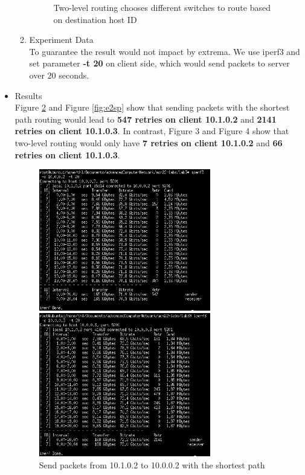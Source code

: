 \documentclass[a4paper,11pt]{article}
\begin{document}
\begin{itemize}
\begin{enumerate}
\begin{figure}[htbp]
        \caption{Two-level routing chooses different switches to route based on destination host ID}
        \label{fig:ft}
        \end{figure}
        \item Experiment Data \\
        To guarantee the result would not impact by extrema.  We use iperf3 and set parameter\textbf{ -t 20} on client side, which would send packets to server over 20 seconds.
    \end{enumerate}
    \item Results \\
    Figure \ref{fig:e1sp} and Figure \ref{fig:e2sp} show that sending packets with the shortest path routing would lead to \textbf{547 retries on client 10.1.0.2} and \textbf{2141 retries on client 10.1.0.3}.  In contrast, Figure 3 and Figure 4 show that two-level routing would only have \textbf{7 retries on client 10.1.0.2} and \textbf{66 retries on client 10.1.0.3}.
    \captionsetup{width=7cm}
    \begin{figure}[htbp]
    \centering
    \begin{minipage}[t]{0.49\textwidth}
    \centering
    \includegraphics[width=7.5cm]{h002-h102-sp.png}
    \caption{Send packets from 10.1.0.2 to 10.0.0.2 with the shortest path}
    \label{fig:e1sp}
    \end{minipage}
    \begin{minipage}[t]{0.49\textwidth}
    \centering
    \includegraphics[width=7.5cm]{h003-h103-sp.png}

\end{minipage}
\end{figure}
\end{itemize}
\end{document}
